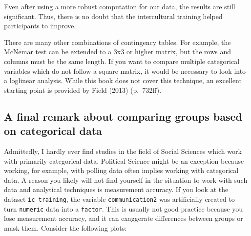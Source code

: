 \documentclass[
  letterpaper,
]{krantz}
\begin{document}
Even after using a more robust computation for our data, the results are
still significant. Thus, there is no doubt that the intercultural
training helped participants to improve.

There are many other combinations of contingency tables. For example,
the McNemar test can be extended to a 3x3 or higher matrix, but the rows
and columns must be the same length. If you want to compare multiple
categorical variables which do not follow a square matrix, it would be
necessary to look into a loglinear analysis. While this book does not
cover this technique, an excellent starting point is provided by Field
(2013) (p.~732ff).

\subsection{A final remark about comparing groups based on categorical
data}\label{sec-a-final-remark-about-comparing-groups-based-on-categorical-data}

Admittedly, I hardly ever find studies in the field of Social Sciences
which work with primarily categorical data. Political Science might be
an exception because working, for example, with polling data often
implies working with categorical data. A reason you likely will not find
yourself in the situation to work with such data and analytical
techniques is measurement accuracy. If you look at the dataset
\texttt{ic\_training}, the variable \texttt{communication2} was
artificially created to turn \texttt{numeric} data into a
\texttt{factor}. This is usually not good practice because you lose
measurement accuracy, and it can exaggerate differences between groups
or mask them. Consider the following plots:
\end{document}
